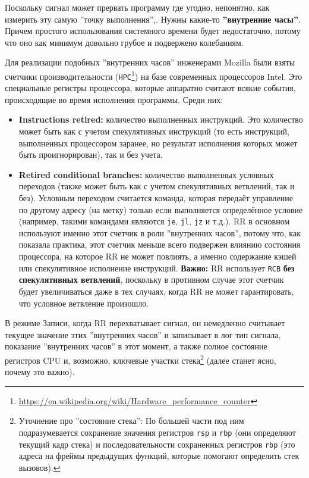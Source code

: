 Поскольку сигнал может
прервать программу где угодно, непонятно, как измерить эту самую ''точку
выполнения'',. Нужны какие-то \textbf{''внутренние часы''}. Причем простого использования
системного времени будет недостаточно, потому что оно как минимум довольно
грубое и подвержено колебаниям.

Для реализации подобных ''внутренних часов'' инженерами Mozilla \cite{rr-paper}
были взяты счетчики производительности
(\texttt{HPC}\footnote{\url{https://en.wikipedia.org/wiki/Hardware_performance_counter}})
на базе современных процессоров Intel. Это специальные регистры процессора,
которые аппаратно считают всякие события, происходящие во время исполнения
программы. Среди них:

\begin{itemize}

  \item \textbf{Instructions retired:} количество выполненных инструкций. Это
  количество может быть как с учетом спекулятивных инструкций (то есть
  инструкций, выполненных процессором заранее, но результат исполнения которых
  может быть проигнорирован), так и без учета.

  \item \textbf{Retired conditional branches:} количество выполненных условных
  переходов (также может быть как с учетом спекулятивных ветвлений, так и без).
  Условным переходом считается команда, которая передаёт управление по другому
  адресу (на метку) только если выполняется определённое условие (например,
  такими командами являются \texttt{je}, \texttt{jl}, \texttt{jz} и т.д.). RR в
  основном используют именно этот счетчик в роли ''внутренних часов'', потому
  что, как показала практика, этот счетчик меньше всего подвержен влиянию
  состояния процессора, на которое RR не может повлиять, а именно содержание
  кэшей или спекулятивное исполнение инструкций. \textbf{Важно:} RR использует
  \texttt{RCB} \textbf{без спекулятивных ветвлений}, поскольку в противном
  случае этот счетчик будет увеличиваться даже в тех случаях, когда RR не может
  гарантировать, что условное ветвление произошло.

\end{itemize}

В режиме Записи, когда RR перехватывает сигнал, он немедленно считывает текущее
значение этих ''внутренних часов'' и записывает в лог тип сигнала, показание
''внутренних часов'' в этот момент, а также полное состояние регистров CPU и,
возможно, ключевые участки стека\footnote{Уточнение про ''состояние стека'': По
большей части под ним подразумевается сохранение значения регистров
\texttt{rsp} и \texttt{rbp} (они определяют текущий кадр стека) и
последовательности сохраненных регистров \texttt{rbp} (это адреса на фреймы
предыдущих функций, которые помогают определить стек вызовов).} (далее станет
ясно, почему это важно).


